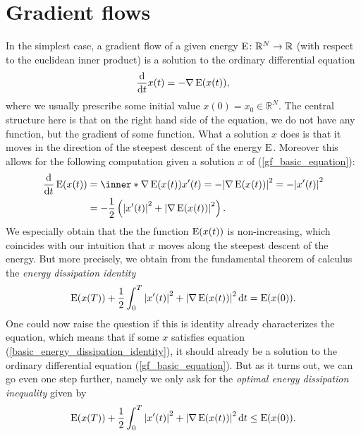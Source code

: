 \section{Gradient flows}
	\label{section_gradient_flows}
In the simplest case, a gradient flow of a given energy $ \operatorname{E} \colon \mathbb{ R }^{ N } \to \mathbb{ R } $ (with respect to the euclidean inner product) is a solution to the ordinary differential equation
\begin{equation}
	\label{gf_basic_equation}
	\dv{ t } x ( t ) = - \nabla \operatorname{E} ( x ( t ) ) ,
\end{equation}
where we usually prescribe some initial value $ x ( 0 ) = x_{ 0 } \in \mathbb{ R }^{ N } $. The central structure here is that on the right hand side of the equation, we do not have any function, but the gradient of some function. What a solution $ x $ does is that it moves in the direction of the steepest descent of the energy $ \operatorname{E} $. Moreover this allows for the following computation given a solution $ x $ of (\ref{gf_basic_equation}):
\begin{align*}
	\dv{ t } \energy ( x ( t ) ) 
	& =
	\inner*{ \nabla \energy ( x ( t ) ) }{ x ' ( t ) }
	=
	- \abs{ \nabla \energy ( x ( t ) ) }^{ 2 }
	=
	- \abs{ x' ( t ) }^{ 2 }
	\\
	& =
	- \frac{ 1 }{ 2 }
	\left(
		\abs{ x'( t ) }^{ 2 }
		+
		\abs{ \nabla \energy ( x ( t ) ) }^{ 2 }
	\right).
\end{align*}
We especially obtain that the the function $ \operatorname{E} ( x ( t ) ) $ is non-increasing, which coincides with our intuition that $ x $ moves along the steepest descent of the energy. But more precisely, we obtain from the fundamental theorem of calculus the \emph{energy dissipation identity}
\begin{equation}
	\label{basic_energy_dissipation_identity}
	\operatorname{E} ( x ( T ) )
	+
	\frac{ 1 }{ 2 }
	\int_{ 0 }^{ T }
		\abs{ x' ( t ) }^{ 2 }
		+
		\abs{ \nabla \operatorname{E} ( x ( t ) ) }^{ 2 }
	\dd{ t }
	= 
	\operatorname{E} ( x ( 0 ) ).
\end{equation}
One could now raise the question if this is identity already characterizes the equation, which means that if some $ x $ satisfies equation (\ref{basic_energy_dissipation_identity}), it should already be a solution to the ordinary differential equation (\ref{gf_basic_equation}). But as it turns out, we can go even one step further, namely we only ask for the \emph{optimal energy dissipation inequality} given by
\begin{equation}
	\label{basic_optimal_energy_dissipation_inequality}
	\operatorname{E} ( x ( T ) )
	+
	\frac{ 1 }{ 2 }
	\int_{ 0 }^{ T }
		\abs{ x' ( t ) }^{ 2 }
		+
		\abs{ \nabla \operatorname{E} ( x ( t ) ) }^{ 2 }
	\dd{ t }
	\leq
	\operatorname{E} ( x ( 0 ) ).
\end{equation}
